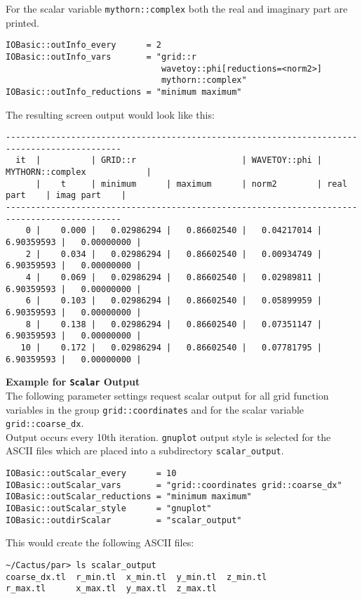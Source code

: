 \documentclass{article}
\begin{document}
For the scalar variable {\tt mythorn::complex} both the real and imaginary part are printed.
\begin{verbatim}
IOBasic::outInfo_every      = 2
IOBasic::outInfo_vars       = "grid::r
                               wavetoy::phi[reductions=<norm2>]
                               mythorn::complex"
IOBasic::outInfo_reductions = "minimum maximum"
\end{verbatim}
\vspace*{2ex}
The resulting screen output would look like this:
\begin{tiny}
\begin{verbatim}
---------------------------------------------------------------------------------------------
  it  |          | GRID::r                     | WAVETOY::phi | MYTHORN::complex            |
      |    t     | minimum      | maximum      | norm2        | real part    | imag part    |
---------------------------------------------------------------------------------------------
    0 |    0.000 |   0.02986294 |   0.86602540 |   0.04217014 |   6.90359593 |   0.00000000 |
    2 |    0.034 |   0.02986294 |   0.86602540 |   0.00934749 |   6.90359593 |   0.00000000 |
    4 |    0.069 |   0.02986294 |   0.86602540 |   0.02989811 |   6.90359593 |   0.00000000 |
    6 |    0.103 |   0.02986294 |   0.86602540 |   0.05899959 |   6.90359593 |   0.00000000 |
    8 |    0.138 |   0.02986294 |   0.86602540 |   0.07351147 |   6.90359593 |   0.00000000 |
   10 |    0.172 |   0.02986294 |   0.86602540 |   0.07781795 |   6.90359593 |   0.00000000 |
\end{verbatim}
\end{tiny}
%
\vspace*{3ex}
{\bf Example for {\tt Scalar} Output}\\
%
The following parameter settings request scalar output for all grid function
variables in the group {\tt grid::coordinates} and for the scalar variable
{\tt grid::coarse\_dx}.\\
Output occurs every 10th iteration. {\tt gnuplot} output style is selected
for the ASCII files which are placed into a subdirectory {\tt scalar\_output}.
\begin{verbatim}
IOBasic::outScalar_every      = 10
IOBasic::outScalar_vars       = "grid::coordinates grid::coarse_dx"
IOBasic::outScalar_reductions = "minimum maximum"
IOBasic::outScalar_style      = "gnuplot"
IOBasic::outdirScalar         = "scalar_output"
\end{verbatim}
\vspace*{2ex}
This would create the following ASCII files:
\begin{verbatim}
~/Cactus/par> ls scalar_output
coarse_dx.tl  r_min.tl  x_min.tl  y_min.tl  z_min.tl
r_max.tl      x_max.tl  y_max.tl  z_max.tl
\end{verbatim}
%
%
\end{document}
